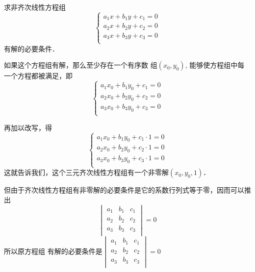 \begin{example}
    求非齐次线性方程组
    \[\begin{cases}
      a_1x+b_1y+c_1=0\\  
      a_2x+b_2y+c_2=0\\  
      a_3x+b_3y+c_3=0\\  
    \end{cases}\]
    有解的必要条件．
\end{example}

\begin{solution}
    如果这个方程组有解，那么至少存在一个有序数
    组$(x_0,y_0)$, 能够使方程组中每一个方程都被满足，即  
    \[\begin{cases}
        a_1x_0+b_1y_0+c_1=0\\  
        a_2x_0+b_2y_0+c_2=0\\  
        a_3x_0+b_3y_0+c_3=0\\  
      \end{cases}\]
    
      再加以改写，得
      \[\begin{cases}
        a_1x_0+b_1y_0+c_1\cdot 1=0\\  
        a_2x_0+b_2y_0+c_2\cdot 1=0\\  
        a_3x_0+b_3y_0+c_3\cdot 1=0\\  
      \end{cases}\]
      这就告诉我们，这个三元齐次线性方程组有一个非零解$(x_0,y_0,1)$．

      但由于齐次线性方程组有非零解的必要条件是它的系数行列式等于零，因而可以推出
      \[\begin{vmatrix}
          a_1&b_1&c_1\\  a_2&b_2&c_2\\  a_3&b_3&c_3\\
      \end{vmatrix}=0\]
      所以原方程组
      有解的必要条件是$\begin{vmatrix}
        a_1&b_1&c_1\\  a_2&b_2&c_2\\  a_3&b_3&c_3\\
    \end{vmatrix}=0$
\end{solution}


